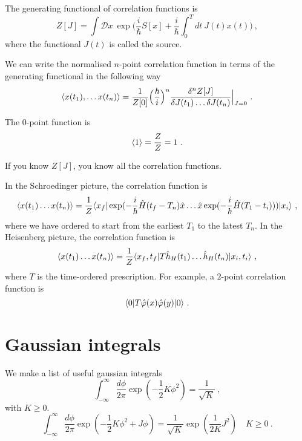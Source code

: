     The generating functional of correlation functions is 
    \begin{equation*}
        Z[J] = \int \mathcal D x ~ \exp \Big(\frac{i}{\hbar} S[x] + \frac{i}{\hbar} \int_0^T dt ~ J(t) x(t) \Big) ~,
    \end{equation*}
    where the functional $J(t)$ is called the source. 

    We can write the normalised $n$-point correlation function in terms of the generating functional in the following way 
    \begin{equation*}
        \langle x(t_1), \ldots x(t_n)\rangle = \frac{1}{Z[0]} \Big ( \frac{\hbar}{i} \Big)^n \frac{\delta^n Z[J]}{\delta J (t_1) \ldots \delta J(t_n)} \Big \vert_{J=0} ~.
    \end{equation*}

    The $0$-point function is 
    \begin{equation*}
        \langle1\rangle = \frac{Z}{Z} = 1~.
    \end{equation*}

    If you know $Z[J]$, you know all the correlation functions. 


    In the Schroedinger picture, the correlation function is 
    \begin{equation*}
        \langle x(t_1) \ldots x(t_n)\rangle = \frac{1}{Z} \langle x_f\vert \exp(- \frac{i}{\hbar} \hat H (t_f - T_n) \hat x \ldots \hat x \exp(- \frac{i}{\hbar} \hat H (T_1 - t_i))) \vert x_i\rangle ~,
    \end{equation*}
    where we have ordered to start from the earliest $T_1$ to the latest $T_n$. In the Heisenberg picture, the correlation function is 
    \begin{equation*}
        \langle x(t_1) \ldots x(t_n)\rangle = \frac{1}{Z} \langle x_f, t_f\vert T \hat h_H (t_1) \ldots \hat h_H (t_n) \vert x_i, t_i\rangle ~,
    \end{equation*}
    where $T$ is the time-ordered prescription. For example, a $2$-point correlation function is 
    \begin{equation*}
        \langle0\vert T \hat \varphi (x) \hat \varphi (y) \vert0\rangle ~.
    \end{equation*}

\chapter{Gaussian integrals}

    We make a list of useful gaussian integrals 
    \begin{equation*}
        \int_{-\infty}^\infty \frac{d\phi}{2\pi} \exp(- \frac{1}{2} K \phi^2) = \frac{1}{\sqrt{K}} ~,
    \end{equation*}
    with $K \geq 0$.
    \begin{equation*}
        \int_{-\infty}^\infty \frac{d\phi}{2\pi} \exp(- \frac{1}{2} K \phi^2 + J \phi) = \frac{1}{\sqrt{K}} \exp(\frac{1}{2K} J^2) \quad K \geq 0 ~.
    \end{equation*}

